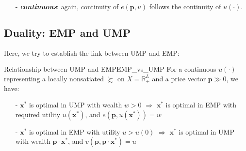 \begin{enumerate}
    A graphic way of understanding the concavity of $e(\mathbf{p},u)$ w.r.t. $\mathbf{p}$ is: for any given $\bar{\mathbf{p}}$ and its EMP optimizer $\bar{\mathbf{x}}$, if prices changes while holding consumption fixed at $\bar{\mathbf{x}}$, the expenditure would be linear in $\mathbf{p}$: $\mathbf{p}\cdot\bar{\mathbf{x}}$. But by the nature of EMP, we know the expenditure function must be the minimum expenditure, i.e. $e(\mathbf{p},u)\leq p\cdot \bar{\mathbf{x}}$, hence the expenditure function lies under the straight line $\mathbf{p}\cdot\bar{\mathbf{x}}$ and touching it only at the EMP optimizers. And this has to be true for any $\mathbf{x}$, therefore, $e(\mathbf{p},u)$ is concave in $\mathbf{p}$ \citep[Figure 3.E.2, Page 60]{mas1995microeconomic}.
    \item[-] \textit{\textbf{continuous}}: again, continuity of $e(\mathbf{p},u)$ follows the continuity of $u(\cdot)$.
\end{enumerate}

\subsection{Duality: EMP and UMP}
Here, we try to establish the link between UMP and EMP:
\begin{theorem}{Relationship between UMP and EMP}{EMP_vs_UMP}
    For a continuous $u(\cdot)$ representing a locally nonsatiated $\succsim$ on $X=\mathbb{R}^L_+$ and a price vector $\mathbf{p}\gg 0$, we have:
    \begin{enumerate}
        \item[-] $\mathbf{x}^*$ is optimal in UMP with wealth $w>0$ $\Rightarrow$ $\mathbf{x}^*$ is optimal in EMP with required utility $u(\mathbf{x}^*)$, and $e(\mathbf{p},u(\mathbf{x}^*))=w$
        \item[-] $\mathbf{x}^*$ is optimal in EMP with utility $u>u(0)$ $\Rightarrow$ $\mathbf{x}^*$ is optimal in UMP with wealth $\mathbf{p}\cdot\mathbf{x}^*$, and $v(\mathbf{p},\mathbf{p}\cdot\mathbf{x}^*)=u$
    \end{enumerate}
\end{theorem}

